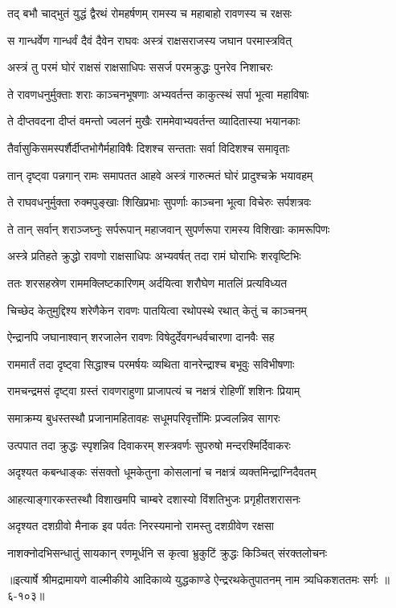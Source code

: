 \twolineshloka
{तद् बभौ चाद्भुतं युद्धं द्वैरथं रोमहर्षणम्}
{रामस्य च महाबाहो रावणस्य च रक्षसः} %

\twolineshloka
{स गान्धर्वेण गान्धर्वं दैवं दैवेन राघवः}
{अस्त्रं राक्षसराजस्य जघान परमास्त्रवित्} %

\twolineshloka
{अस्त्रं तु परमं घोरं राक्षसं राक्षसाधिपः}
{ससर्ज परमक्रुद्धः पुनरेव निशाचरः} %

\twolineshloka
{ते रावणधनुर्मुक्ताः शराः काञ्चनभूषणाः}
{अभ्यवर्तन्त काकुत्स्थं सर्पा भूत्वा महाविषाः} %

\twolineshloka
{ते दीप्तवदना दीप्तं वमन्तो ज्वलनं मुखैः}
{राममेवाभ्यवर्तन्त व्यादितास्या भयानकाः} %

\twolineshloka
{तैर्वासुकिसमस्पर्शैर्दीप्तभोगैर्महाविषैः}
{दिशश्च सन्तताः सर्वा विदिशश्च समावृताः} %

\twolineshloka
{तान् दृष्ट्वा पन्नगान् रामः समापतत आहवे}
{अस्त्रं गारुत्मतं घोरं प्रादुश्चक्रे भयावहम्} %

\twolineshloka
{ते राघवधनुर्मुक्ता रुक्मपुङ्खाः शिखिप्रभाः}
{सुपर्णाः काञ्चना भूत्वा विचेरुः सर्पशत्रवः} %

\twolineshloka
{ते तान् सर्वान् शराञ्जघ्नुः सर्परूपान् महाजवान्}
{सुपर्णरूपा रामस्य विशिखाः कामरूपिणः} %

\twolineshloka
{अस्त्रे प्रतिहते क्रुद्धो रावणो राक्षसाधिपः}
{अभ्यवर्षत् तदा रामं घोराभिः शरवृष्टिभिः} %

\twolineshloka
{ततः शरसहस्रेण राममक्लिष्टकारिणम्}
{अर्दयित्वा शरौघेण मातलिं प्रत्यविध्यत} %

\twolineshloka
{चिच्छेद केतुमुद्दिश्य शरेणैकेन रावणः}
{पातयित्वा रथोपस्थे रथात् केतुं च काञ्चनम्} %

\twolineshloka
{ऐन्द्रानपि जघानाश्वान् शरजालेन रावणः}
{विषेदुर्देवगन्धर्वचारणा दानवैः सह} %

\twolineshloka
{राममार्तं तदा दृष्ट्वा सिद्धाश्च परमर्षयः}
{व्यथिता वानरेन्द्राश्च बभूवुः सविभीषणाः} %

\twolineshloka
{रामचन्द्रमसं दृष्ट्वा ग्रस्तं रावणराहुणा}
{प्राजापत्यं च नक्षत्रं रोहिणीं शशिनः प्रियाम्} %

\twolineshloka
{समाक्रम्य बुधस्तस्थौ प्रजानामहितावहः}
{सधूमपरिवृर्त्तोमिः प्रज्वलन्निव सागरः} %

\twolineshloka
{उत्पपात तदा क्रुद्धः स्पृशन्निव दिवाकरम्}
{शस्त्रवर्णः सुपरुषो मन्दरश्मिर्दिवाकरः} %

\twolineshloka
{अदृश्यत कबन्धाङ्कः संसक्तो धूमकेतुना}
{कोसलानां च नक्षत्रं व्यक्तमिन्द्राग्निदैवतम्} %

\twolineshloka
{आहत्याङ्गारकस्तस्थौ विशाखमपि चाम्बरे}
{दशास्यो विंशतिभुजः प्रगृहीतशरासनः} %

\twolineshloka
{अदृश्यत दशग्रीवो मैनाक इव पर्वतः}
{निरस्यमानो रामस्तु दशग्रीवेण रक्षसा} %

\twolineshloka
{नाशक्नोदभिसन्धातुं सायकान् रणमूर्धनि}
{स कृत्वा भ्रुकुटिं क्रुद्धः किञ्चित् संरक्तलोचनः} %


॥इत्यार्षे श्रीमद्रामायणे वाल्मीकीये आदिकाव्ये युद्धकाण्डे ऐन्द्ररथकेतुपातनम् नाम त्र्यधिकशततमः सर्गः ॥६-१०३॥
